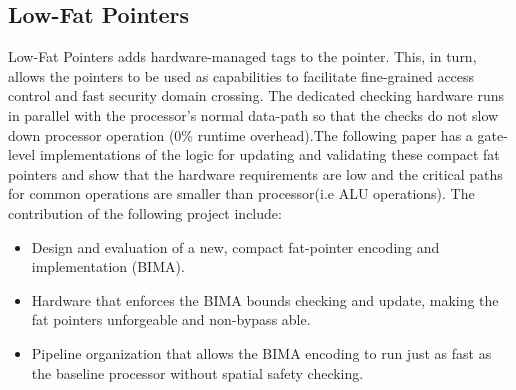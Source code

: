 
\subsection{Low-Fat Pointers}
Low-Fat Pointers adds hardware-managed tags to the pointer. 
This, in turn, allows the pointers to be used as capabilities to facilitate fine-grained 
access control and fast security domain crossing. The dedicated checking hardware runs in parallel 
with the processor's normal data-path so that the checks do not slow down processor operation 
(0\% runtime overhead).The following paper has a gate-level implementations of the logic for updating 
and validating these compact fat pointers and show that the hardware requirements are low 
and the critical paths for common operations are smaller than processor(i.e ALU operations).
The contribution of the following project include: 
\begin{itemize}
  \item Design and evaluation of a new, compact fat-pointer
  encoding and implementation (BIMA).
  \item Hardware that enforces the BIMA bounds checking and update, making the fat pointers 
  unforgeable and non-bypass able.
  \item Pipeline organization that allows the BIMA encoding to run just as fast as the baseline
   processor without spatial safety checking.
\end{itemize}






